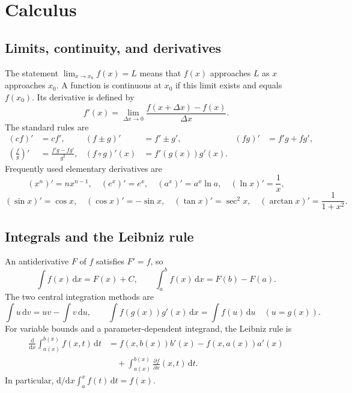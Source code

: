 \section{Calculus}

\subsection{Limits, continuity, and derivatives}

The statement $\lim_{x\to x_0}f(x)=L$ means that $f(x)$ approaches $L$ as $x$ approaches $x_0$. A function is continuous at $x_0$ if this limit exists and equals $f(x_0)$. Its derivative is defined by
\begin{equation}
f'(x)=\lim_{\Delta x\to0}\frac{f(x+\Delta x)-f(x)}{\Delta x}.
\end{equation}
The standard rules are
\begin{align}
(cf)'&=cf', & (f\pm g)'&=f'\pm g', & (fg)'&=f'g+fg',\\
\left(\frac{f}{g}\right)'&=\frac{f'g-fg'}{g^2}, & (f\circ g)'(x)&=f'(g(x))g'(x).
\end{align}
Frequently used elementary derivatives are
\begin{equation}
(x^n)'=nx^{n-1},\quad (e^x)'=e^x,\quad (a^x)'=a^x\ln a,\quad (\ln x)'=\frac1x,
\end{equation}
\begin{equation}
(\sin x)'=\cos x,\quad (\cos x)'=-\sin x,\quad (\tan x)'=\sec^2x,\quad (\arctan x)'=\frac{1}{1+x^2}.
\end{equation}

\subsection{Integrals and the Leibniz rule}

An antiderivative $F$ of $f$ satisfies $F'=f$, so
\begin{equation}
\int f(x)\,\mathrm{d}x=F(x)+C,
\qquad
\int_a^b f(x)\,\mathrm{d}x=F(b)-F(a).
\end{equation}
The two central integration methods are
\begin{equation}
\int u\,\mathrm{d}v=uv-\int v\,\mathrm{d}u,
\qquad
\int f(g(x))g'(x)\,\mathrm{d}x=\int f(u)\,\mathrm{d}u\quad(u=g(x)).
\end{equation}
For variable bounds and a parameter-dependent integrand, the Leibniz rule is
\begin{align}
\frac{\mathrm{d}}{\mathrm{d}x}\int_{a(x)}^{b(x)}f(x,t)\,\mathrm{d}t
&=f(x,b(x))b'(x)-f(x,a(x))a'(x)\nonumber\\
&\quad+\int_{a(x)}^{b(x)}\frac{\partial f}{\partial x}(x,t)\,\mathrm{d}t.
\end{align}
In particular, $\mathrm{d}/\mathrm{d}x\int_a^x f(t)\,\mathrm{d}t=f(x)$.

